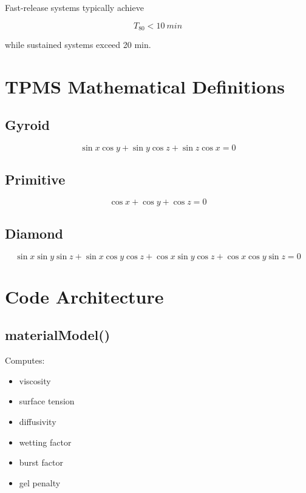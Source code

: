 \documentclass[11pt]{article}
\begin{document}
Fast-release systems typically achieve

\begin{equation}
T_{80}<10\ min
\end{equation}

while sustained systems exceed 20 min.

\section{TPMS Mathematical Definitions}

\subsection{Gyroid}

\begin{equation}
\sin x \cos y
+\sin y \cos z
+\sin z \cos x=0
\end{equation}

\subsection{Primitive}

\begin{equation}
\cos x+\cos y+\cos z=0
\end{equation}

\subsection{Diamond}

\begin{equation}
\sin x\sin y\sin z
+\sin x\cos y\cos z
+\cos x\sin y\cos z
+\cos x\cos y\sin z=0
\end{equation}

\section{Code Architecture}

\subsection{materialModel()}

Computes:

\begin{itemize}
\item viscosity
\item surface tension
\item diffusivity
\item wetting factor
\item burst factor
\item gel penalty
\end{itemize}
\end{document}
